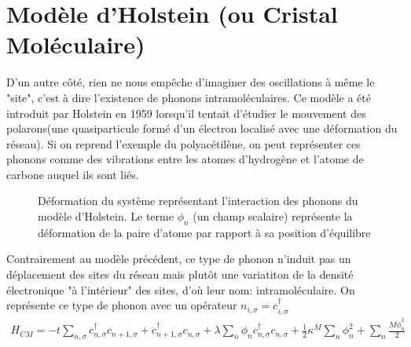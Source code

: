 \section{Modèle d'Holstein (ou Cristal Moléculaire)}
D'un autre côté, rien ne nous empêche d'imaginer des oscillations à même le "site", c'est à dire l'existence de phonons intramoléculaires. Ce modèle a été introduit par Holstein en 1959 lorsqu'il tentait d'étudier le mouvement des polarons(une quasiparticule formé d'un électron localisé avec une déformation du réseau)\cite{holstein_studies_1959}. Si on reprend l'exemple du polyacétilène, on peut représenter ces phonons comme des vibrations entre les atomes d'hydrogène et l'atome de carbone auquel ils sont liés. 
\begin{figure}[H]
    \centering
    \caption{Déformation du système représentant l'interaction des phonons du modèle d'Holstein. Le terme $\phi_n$ (un champ scalaire) représente la déformation de la paire d'atome par rapport à sa position d'équilibre}
\end{figure}
Contrairement au modèle précédent, ce type de phonon n'induit pas un déplacement des sites du réseau mais plutôt une variatiton de la densité électronique "à l'intérieur" des sites, d'où leur nom: intramoléculaire. On représente ce type de phonon avec un opérateur $n_{i,\sigma} = c^\dagger_{i,\sigma}$
\begin{align}
    H_{CM} =-t\sum_{n,\sigma} c^\dagger_{n,\sigma}c_{n+1,\sigma} + c^\dagger_{n+1,\sigma}c_{n,\sigma}  + \lambda\sum_n\phi_n c^\dagger_{n,\sigma}c_{n,\sigma} + \frac{1}{2}\kappa^{M}\sum_n\phi_n^2 + \sum_n\frac{M\dot{\phi}_n^2}{2}
\end{align}
